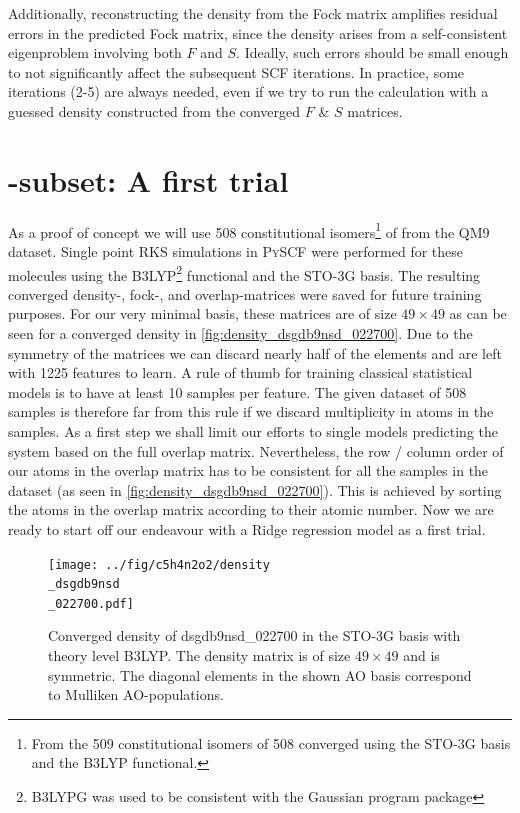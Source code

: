 Additionally, reconstructing the density from the Fock matrix amplifies residual errors in the predicted Fock matrix, since the density arises from a self-consistent eigenproblem involving both $F$ and $S$. Ideally, such errors should be small enough to not significantly affect the subsequent SCF iterations. In practice, some iterations (2-5) are always needed, even if we try to run the calculation with a guessed density constructed from the converged $F$ \& $S$ matrices.\\

\section{-subset: A first trial}
\label{sec:qm9_c5h4n2o2}

As a proof of concept we will use 508 constitutional isomers\footnote{From the 509 constitutional isomers of  508 converged using the STO-3G basis and the B3LYP functional.} of  from the QM9 dataset. 
Single point RKS simulations in \textsc{PySCF} \parencite{ref:pyscf} were performed for these molecules using the B3LYP\footnote{B3LYPG was used to be consistent with the Gaussian program package} functional and the STO-3G basis. The resulting converged density-, fock-, and overlap-matrices were saved for future training purposes. For our very minimal basis, these matrices are of size $49 \times 49$ as can be seen for a converged density in \autoref{fig:density_dsgdb9nsd_022700}. 
Due to the symmetry of the matrices we can discard nearly half of the elements and are left with 1225 features to learn. A rule of thumb for training classical statistical models is to have at least 10 samples per feature. \parencite{ref:rule_of_10} The given dataset of 508 samples is therefore far from this rule if we discard multiplicity in atoms in the samples. As a first step we shall limit our efforts to single models predicting the system based on the full overlap matrix. Nevertheless, the row / column order of our atoms in the overlap matrix has to be consistent for all the samples in the dataset (as seen in \autoref{fig:density_dsgdb9nsd_022700}). This is achieved by sorting the atoms in the overlap matrix according to their atomic number. Now we are ready to start off our endeavour with a Ridge regression model as a first trial. 

\begin{figure}[H]
    \centering
    \texttt{[image: ../fig/c5h4n2o2/density\\\_dsgdb9nsd\\\_022700.pdf]}
    \caption[Density matrix of dsgdb9nsd\_022700 in the STO-3G basis with theory level B3LYP]{Converged density of dsgdb9nsd\_022700 in the STO-3G basis with theory level B3LYP. The density matrix is of size $49 \times 49$ and is symmetric. The diagonal elements in the shown AO basis correspond to Mulliken AO-populations. }
    \label{fig:density_dsgdb9nsd_022700}
\end{figure}


